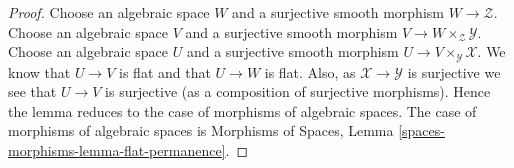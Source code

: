 \documentclass[10pt,a4paper]{amsart}
\theoremstyle{plain}
\theoremstyle{definition}
\theoremstyle{remark}
\numberwithin{equation}{subsection}
\begin{document}
\begin{proof}
Choose an algebraic space $W$ and a surjective smooth morphism
$W \to \mathcal{Z}$. Choose an algebraic space $V$ and a surjective smooth
morphism $V \to W \times_\mathcal{Z} \mathcal{Y}$. Choose an algebraic space
$U$ and a surjective smooth morphism $U \to V \times_\mathcal{Y} \mathcal{X}$.
We know that $U \to V$ is flat and that $U \to W$ is flat.
Also, as $\mathcal{X} \to \mathcal{Y}$ is surjective we see that
$U \to V$ is surjective (as a composition of surjective morphisms).
Hence the lemma reduces to the case of morphisms of algebraic spaces.
The case of morphisms of algebraic spaces is
Morphisms of Spaces, Lemma
\ref{spaces-morphisms-lemma-flat-permanence}.
\end{proof}
\end{document}
